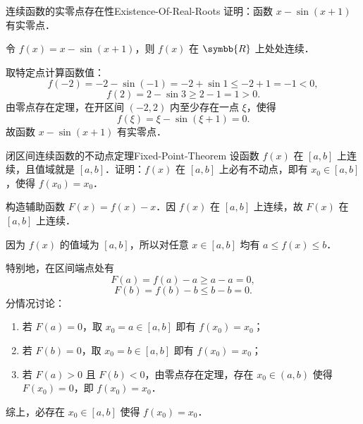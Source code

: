 \begin{problem}{连续函数的实零点存在性}{Existence-Of-Real-Roots}
    证明：函数 $x - \sin(x+1)$ 有实零点．
\end{problem}

\begin{myproof}
    令 $f(x) = x - \sin(x+1)$，则 $f(x)$ 在 $\symbb{R}$ 上处处连续．

    取特定点计算函数值：
    \begin{equation}
        f(-2) = -2 - \sin(-1) = -2 + \sin 1 \leqslant -2 + 1 = -1 < 0,
    \end{equation}
    \begin{equation}
        f(2) = 2 - \sin 3 \geqslant 2 - 1 = 1 > 0.
    \end{equation}
    由零点存在定理，在开区间 $(-2, 2)$ 内至少存在一点 $\xi$，使得
    \begin{equation}
        f(\xi) = \xi - \sin(\xi + 1) = 0.
    \end{equation}
    故函数 $x - \sin(x+1)$ 有实零点．
\end{myproof}

\begin{problem}{闭区间连续函数的不动点定理}{Fixed-Point-Theorem}
    设函数 $f(x)$ 在 $[a, b]$ 上连续，且值域就是 $[a, b]$．证明：$f(x)$ 在 $[a, b]$ 上必有不动点，即有 $x_0 \in [a, b]$，使得 $f(x_0) = x_0$．
\end{problem}

\begin{myproof}
    构造辅助函数 $F(x) = f(x) - x$．因 $f(x)$ 在 $[a, b]$ 上连续，故 $F(x)$ 在 $[a, b]$ 上连续．

    因为 $f(x)$ 的值域为 $[a, b]$，所以对任意 $x \in [a, b]$ 均有 $a \leqslant f(x) \leqslant b$．

    特别地，在区间端点处有
    \begin{equation}
        F(a) = f(a) - a \geqslant a - a = 0,
    \end{equation}
    \begin{equation}
        F(b) = f(b) - b \leqslant b - b = 0.
    \end{equation}
    分情况讨论：
    \begin{enumerate}
        \item 若 $F(a) = 0$，取 $x_0 = a \in [a, b]$ 即有 $f(x_0) = x_0$；
        \item 若 $F(b) = 0$，取 $x_0 = b \in [a, b]$ 即有 $f(x_0) = x_0$；
        \item 若 $F(a) > 0$ 且 $F(b) < 0$，由零点存在定理，存在 $x_0 \in (a, b)$ 使得 $F(x_0) = 0$，即 $f(x_0) = x_0$．
    \end{enumerate}
    综上，必存在 $x_0 \in [a, b]$ 使得 $f(x_0) = x_0$．
\end{myproof}


